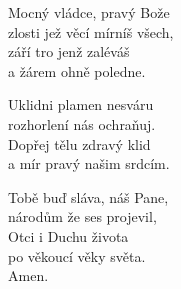 \begin{translatioMulticol}{3}
Mocný vládce, pravý Bože\\
zlosti jež věcí mírníš všech,\\
září \ji{}tro jenž zaléváš\\
a žárem ohně poledne.\columnbreak

Uklidni plamen nesváru\\
rozhorlení nás ochraňuj.\\
Dopřej tělu zdravý klid\\
a mír pravý našim srdcím.\columnbreak

Tobě buď sláva, náš Pane,\\
národům že ses projevil,\\
Otci i Duchu života\\
po věkoucí věky světa.\\
Amen.
\end{translatioMulticol}
